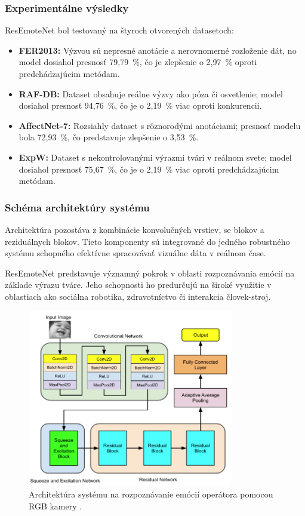 \subsubsection{Experimentálne výsledky}

ResEmoteNet bol testovaný na štyroch otvorených datasetoch:
\begin{itemize}
    \item \textbf{FER2013:} Výzvou sú nepresné anotácie a nerovnomerné rozloženie dát, no model dosiahol presnosť 79,79~\%, čo je zlepšenie o 2,97~\% oproti predchádzajúcim metódam.
    \item \textbf{RAF-DB:} Dataset obsahuje reálne výzvy ako póza či osvetlenie; model dosiahol presnosť 94,76~\%, čo je o 2,19~\% viac oproti konkurencii.
    \item \textbf{AffectNet-7:} Rozsiahly dataset s rôznorodými anotáciami; presnosť modelu bola 72,93~\%, čo predstavuje zlepšenie o 3,53~\%.
    \item \textbf{ExpW:} Dataset s nekontrolovanými výrazmi tvárí v reálnom svete; model dosiahol presnosť 75,67~\%, čo je o 2,19~\% viac oproti predchádzajúcim metódam.
\end{itemize}

\subsubsection{Schéma architektúry systému}

Architektúra pozostáva z kombinácie konvolučných vrstiev, \gls{se} blokov a reziduálnych blokov. Tieto komponenty sú integrované do jedného robustného systému schopného efektívne spracovávať vizuálne dáta v reálnom čase.

ResEmoteNet predstavuje významný pokrok v oblasti rozpoznávania emócií na základe výrazu tváre. Jeho schopnosti ho predurčujú na široké využitie v oblastiach ako sociálna robotika, zdravotníctvo či interakcia človek-stroj.

\begin{figure}[!htpb]
    \centering
    \includegraphics[width=0.8\textwidth]{img/architecture.png}
    \caption{Architektúra systému na rozpoznávanie emócií operátora pomocou RGB kamery \cite{misc01}.} 
    \label{fig:architecture}
\end{figure}
\newpage

